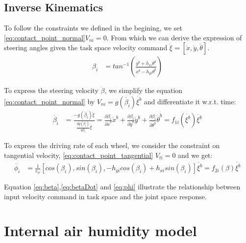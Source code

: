 \subsection{Inverse Kinematics}
\label{sec:inverseKinematics}

To follow the constraints we defined in the begining, we set \cref{eq:contact_point_normal}$V_{ni}=0$. From which we can derive the expression of steering angles given the task space velocity command 
$\dot{\xi}=[\dot{x},\dot{y},\dot{\theta}]$.
\begin{equation}\label{eq:beta}
	\begin{split}
	\beta_i &= tan^{-1}(\frac{\dot{y^b}+h_{xi}\dot{\theta^b}}{\dot{x^b}-h_{yi}\dot{\theta^b}})
	\end{split}
\end{equation}

To express the steering velocity $\dot{\beta}$, we simplify the equation \cref{eq:contact_point_normal} by $V_{ni}=g(\dot{\beta_i})\dot{\xi^b}$ and differentiate it w.r.t. time:
\begin{equation}\label{eq:betaDot}
	\begin{split}
	\dot{\beta_i} &= \frac{-g(\dot{\beta_i})\ddot{\xi}}{\frac{dg(\dot{\beta_i})}{d\beta_i}\dot{\xi}}=\frac{\partial\beta_i}{\partial\dot{x}^b}\ddot{x}^b+\frac{\partial\beta_i}{\partial\dot{y}^b}\ddot{y}^b +\frac{\partial\beta_i}{\partial\dot{\theta^b}}\ddot{\theta}^b
	=f_{1i}(\dot{\xi^b})\ddot{\xi^b}
	\end{split}
\end{equation}

To express the driving rate of each wheel, we consider the constraint on tangential velocity, \cref{eq:contact_point_tangential} $V_{ti}=0 $ and we get:
\begin{equation}\label{eq:phi}
	\begin{split}
	\dot{\phi_i} &= \frac{1}{r_w}[cos(\beta_i), sin(\beta_i), -h_{yi}cos(\beta_i)+h_{xi}sin(\beta_i)]\dot{\xi^b}=f_{2i}(\beta)\dot{\xi^b}
	\end{split}
\end{equation}

Equation \cref{eq:beta},\cref{eq:betaDot} and \cref{eq:phi} illustrate the relationship between input velocity command in task space and the joint space response. 

\section{Internal air humidity model}
\label{sec:hum}
